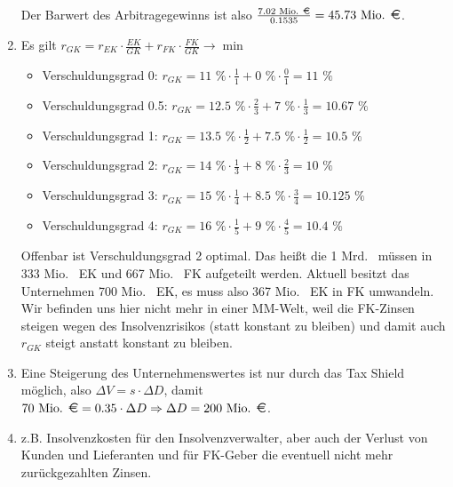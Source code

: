 \documentclass{article}
\begin{document}
\begin{enumerate}[label=(\alph*)]
\begin{align}
		\end{align}
		Der Barwert des Arbitragegewinns ist also $\frac{7.02\text{ Mio. \EUR}}{0.1535}=45.73\text{ Mio. \EUR}$.
		\item Es gilt $r_{GK}=r_{EK}\cdot\frac{EK}{GK} + r_{FK}\cdot\frac{FK}{GK}\to\min$
		\begin{itemize}
			\item Verschuldungsgrad 0: $r_{GK}=11\text{ \%}\cdot \frac{1}{1} + 0\text{ \%}\cdot\frac{0}{1}=11\text{ \%}$
			\item Verschuldungsgrad 0.5: $r_{GK}=12.5\text{ \%}\cdot \frac{2}{3} + 7\text{ \%}\cdot\frac{1}{3}=10.67\text{ \%}$
			\item Verschuldungsgrad 1: $r_{GK}=13.5\text{ \%}\cdot \frac{1}{2} + 7.5\text{ \%}\cdot\frac{1}{2}=10.5\text{ \%}$
			\item Verschuldungsgrad 2: $r_{GK}=14\text{ \%}\cdot \frac{1}{3} + 8\text{ \%}\cdot\frac{2}{3}=10\text{ \%}$
			\item Verschuldungsgrad 3: $r_{GK}=15\text{ \%}\cdot \frac{1}{4} + 8.5\text{ \%}\cdot\frac{3}{4}=10.125\text{ \%}$
			\item Verschuldungsgrad 4: $r_{GK}=16\text{ \%}\cdot \frac{1}{5} + 9\text{ \%}\cdot\frac{4}{5}=10.4\text{ \%}$
		\end{itemize}
		Offenbar ist Verschuldungsgrad 2 optimal. Das heißt die 1 Mrd. \EUR\, müssen in 333 Mio. \EUR\, EK und 667 Mio. \EUR\, FK aufgeteilt werden. Aktuell besitzt das Unternehmen 700 Mio. \EUR\, EK, es muss also 367 Mio. \EUR\, EK in FK umwandeln. \\
		Wir befinden uns hier nicht mehr in einer MM-Welt, weil die FK-Zinsen steigen wegen des Insolvenzrisikos (statt konstant zu bleiben) und damit auch $r_{GK}$ steigt anstatt konstant zu bleiben.
		\item Eine Steigerung des Unternehmenswertes ist nur durch das Tax Shield möglich, also $\Delta V=s\cdot\Delta D$, damit $70\text{ Mio. \EUR}=0.35\cdot\Delta D \Rightarrow \Delta D=200\text{ Mio. \EUR}$.
		\item z.B. Insolvenzkosten für den Insolvenzverwalter, aber auch der Verlust von Kunden und Lieferanten und für FK-Geber die eventuell nicht mehr zurückgezahlten Zinsen.
	\end{enumerate}
\end{document}
